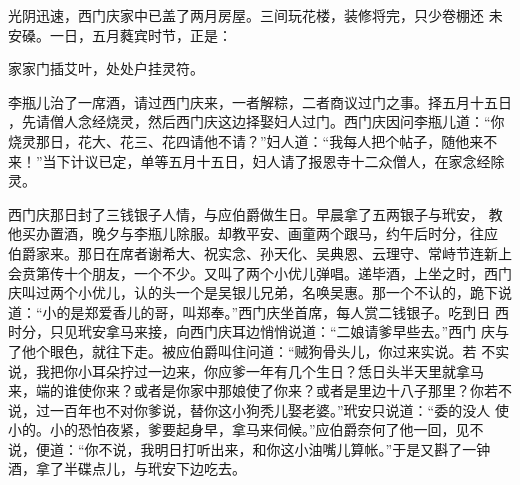 光阴迅速，西门庆家中已盖了两月房屋。三间玩花楼，装修将完，只少卷棚还
未安磉。一日，五月蕤宾时节，正是：

家家门插艾叶，处处户挂灵符。

李瓶儿治了一席酒，请过西门庆来，一者解粽，二者商议过门之事。择五月十五日
，先请僧人念经烧灵，然后西门庆这边择娶妇人过门。西门庆因问李瓶儿道：“你
烧灵那日，花大、花三、花四请他不请？”妇人道：“我每人把个帖子，随他来不
来！”当下计议已定，单等五月十五日，妇人请了报恩寺十二众僧人，在家念经除
灵。

西门庆那日封了三钱银子人情，与应伯爵做生日。早晨拿了五两银子与玳安，
教他买办置酒，晚夕与李瓶儿除服。却教平安、画童两个跟马，约午后时分，往应
伯爵家来。那日在席者谢希大、祝实念、孙天化、吴典恩、云理守、常峙节连新上
会贲第传十个朋友，一个不少。又叫了两个小优儿弹唱。递毕酒，上坐之时，西门
庆叫过两个小优儿，认的头一个是吴银儿兄弟，名唤吴惠。那一个不认的，跪下说
道：“小的是郑爱香儿的哥，叫郑奉。”西门庆坐首席，每人赏二钱银子。吃到日
西时分，只见玳安拿马来接，向西门庆耳边悄悄说道：“二娘请爹早些去。”西门
庆与了他个眼色，就往下走。被应伯爵叫住问道：“贼狗骨头儿，你过来实说。若
不实说，我把你小耳朵拧过一边来，你应爹一年有几个生日？恁日头半天里就拿马
来，端的谁使你来？或者是你家中那娘使了你来？或者是里边十八子那里？你若不
说，过一百年也不对你爹说，替你这小狗秃儿娶老婆。”玳安只说道：“委的没人
使小的。小的恐怕夜紧，爹要起身早，拿马来伺候。”应伯爵奈何了他一回，见不
说，便道：“你不说，我明日打听出来，和你这小油嘴儿算帐。”于是又斟了一钟
酒，拿了半碟点儿，与玳安下边吃去。

